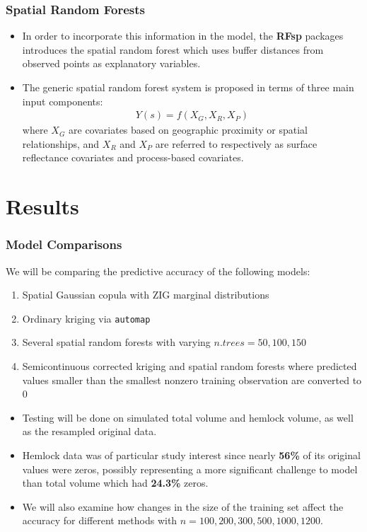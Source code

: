\documentclass{beamer}
\begin{document}
\begin{frame}
	\frametitle{Spatial Random Forests}
	\begin{itemize}
		\item In order to incorporate this information in the model, the \textbf{RFsp} packages introduces the spatial random forest which uses buffer distances from observed points as explanatory variables.
		\item The generic spatial random forest system is proposed in terms of three main input components:
		\begin{align*}
		Y(s) = f(X_G, X_R, X_P)
		\end{align*}
		where $X_G$ are covariates based on geographic proximity or spatial relationships, and $X_R$ and $X_P$ are referred to respectively as surface reflectance covariates and process-based covariates.
	\end{itemize}
\end{frame}

\section{Results}
\begin{frame}
	\frametitle{Model Comparisons}
	We will be comparing the predictive accuracy of the following models:
	\begin{enumerate}
		\item Spatial Gaussian copula with ZIG marginal distributions
		\item Ordinary kriging via \texttt{automap}
		\item Several spatial random forests with varying $n.trees = 50, 100, 150$
		\item Semicontinuous corrected kriging and spatial random forests where predicted values smaller than the smallest nonzero training observation are converted to 0
	\end{enumerate}
	\begin{itemize}
		\item Testing will be done on simulated total volume and hemlock volume, as well as the resampled original data.
		\item Hemlock data was of particular study interest since nearly \textbf{56\%} of its original values were zeros, possibly representing a more significant challenge to model than total volume which had \textbf{24.3\%} zeros.
		\item We will also examine how changes in the size of the training set affect the accuracy for different methods with $n = 100, 200, 300, 500, 1000, 1200$.
	\end{itemize}
\end{frame}
\end{document}
